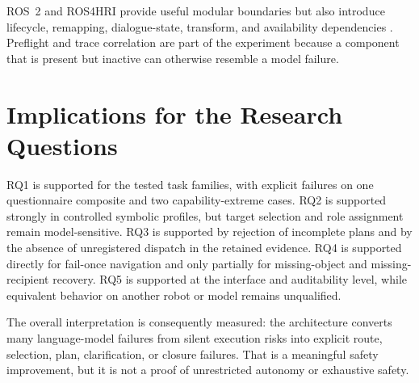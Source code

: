 ROS~2 and ROS4HRI provide useful modular boundaries but also introduce lifecycle, remapping, dialogue-state, transform, and availability dependencies \parencite{quigley2009ros,macenski2022ros2,mohamed2020ros4hri}. Preflight and trace correlation are part of the experiment because a component that is present but inactive can otherwise resemble a model failure.

\section{Implications for the Research Questions}

RQ1 is supported for the tested task families, with explicit failures on one questionnaire composite and two capability-extreme cases. RQ2 is supported strongly in controlled symbolic profiles, but target selection and role assignment remain model-sensitive. RQ3 is supported by rejection of incomplete plans and by the absence of unregistered dispatch in the retained evidence. RQ4 is supported directly for fail-once navigation and only partially for missing-object and missing-recipient recovery. RQ5 is supported at the interface and auditability level, while equivalent behavior on another robot or model remains unqualified.

The overall interpretation is consequently measured: the architecture converts many language-model failures from silent execution risks into explicit route, selection, plan, clarification, or closure failures. That is a meaningful safety improvement, but it is not a proof of unrestricted autonomy or exhaustive safety.
